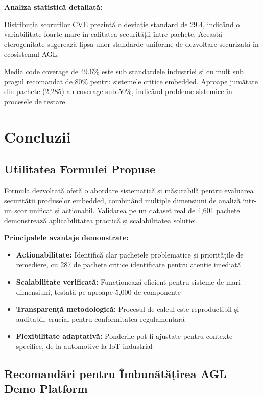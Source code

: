 \documentclass[12pt,a4paper]{article}
\begin{document}
\textbf{Analiza statistică detaliată:}

Distribuția scorurilor CVE prezintă o deviație standard de 29.4, indicând o variabilitate foarte mare în calitatea securității între pachete. Această eterogenitate sugerează lipsa unor standarde uniforme de dezvoltare securizată în ecosistemul AGL.

Media code coverage de 49.6\% este sub standardele industriei și cu mult sub pragul recomandat de 80\% pentru sistemele critice embedded. Aproape jumătate din pachete (2,285) au coverage sub 50\%, indicând probleme sistemice în procesele de testare.

\section{Concluzii}

\subsection{Utilitatea Formulei Propuse}

Formula dezvoltată oferă o abordare sistematică și măsurabilă pentru evaluarea securității produselor embedded, combinând multiple dimensiuni de analiză într-un scor unificat și actionabil. Validarea pe un dataset real de 4,601 pachete demonstrează aplicabilitatea practică și scalabilitatea soluției.

\textbf{Principalele avantaje demonstrate:}

\begin{itemize}
\item \textbf{Actionabilitate:} Identifică clar pachetele problematice și prioritățile de remediere, cu 287 de pachete critice identificate pentru atenție imediată
\item \textbf{Scalabilitate verificată:} Funcționează eficient pentru sisteme de mari dimensiuni, testată pe aproape 5,000 de componente
\item \textbf{Transparență metodologică:} Procesul de calcul este reproductibil și auditabil, crucial pentru conformitatea regulamentară
\item \textbf{Flexibilitate adaptativă:} Ponderile pot fi ajustate pentru contexte specifice, de la automotive la IoT industrial
\end{itemize}

\subsection{Recomandări pentru Îmbunătățirea AGL Demo Platform}
\end{document}
